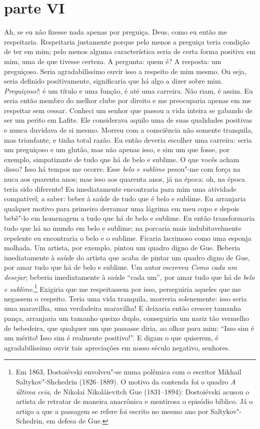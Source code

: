 \section{parte VI}

Ah, se eu não fizesse nada apenas por preguiça. Deus, como eu então me
respeitaria. Respeitaria justamente porque pelo menos a preguiça teria condição
de ter em mim; pelo menos alguma característica seria de certa forma positiva
em mim, uma de que tivesse certeza. A pergunta: quem é?  A resposta: um
preguiçoso. Seria agradabilíssimo ouvir isso a respeito de mim mesmo. Ou seja,
seria definido positivamente, significaria que há algo a dizer sobre mim.
\textit{Preguiçoso!}: é um título e uma função, é até uma carreira. Não riam, é assim.
Eu seria então membro do melhor clube por direito e me preocuparia apenas em me
respeitar sem cessar.  Conheci um senhor que passou a vida inteira se gabando
de ser um perito em Lafite. Ele considerava aquilo uma de suas qualidades
positivas e nunca duvidava de si mesmo. Morreu com a consciência não somente
tranquila, mas triunfante, e tinha total razão. Eu então deveria escolher uma
carreira: seria um preguiçoso e um glutão, mas não apenas isso, e sim um que
fosse, por exemplo, simpatizante de tudo que há de belo e sublime. O que vocês
acham disso? Isso há tempos me ocorre. Esse \textit{belo e sublime} pesou"-me com força
na nuca aos quarenta anos; mas isso aos quarenta anos, já na época: oh, na
época teria sido diferente! Eu imediatamente encontraria para mim uma atividade
compatível; a saber: beber à saúde de tudo que é belo e sublime. Eu arranjaria
qualquer motivo para primeiro derramar uma lágrima em meu copo e depois bebê"-lo
em homenagem a tudo que há de belo e sublime. Eu então transformaria tudo que
há no mundo em belo e sublime; na porcaria mais indubitavelmente repelente eu
encontraria o belo e o sublime. Ficaria lacrimoso como uma esponja molhada. Um
artista, por exemplo, pintou um quadro digno de Gue. Beberia imediatamente à
saúde do artista que acaba de pintar um quadro digno de Gue, por amar tudo que
há de belo e sublime. Um autor escreveu \textit{Como cada um desejar};
beberia imediatamente à saúde ``cada um'', por amar tudo que há de \textit{belo e
sublime}.\footnote{ Em 1863, Dostoiévski envolveu"-se numa polêmica com o
escritor Mikhail Saltykov"-Shchedrin (1826--1889). O motivo da contenda foi o
quadro \textit{A última ceia}, de Nikolai Nikoláievitch Gue (1831--1894):
Dostoiévski acusou o artista de retratar de maneira anacrônica e mentirosa o
episódio bíblico. Já o artigo a que a passagem se refere foi escrito no mesmo
ano por Saltykov"-Schedrin, em defesa de Gue.} Exigiria que me respeitassem por
isso, perseguiria aqueles que me negassem o respeito.  Teria uma vida
tranquila, morreria solenemente: isso seria uma maravilha, uma verdadeira
maravilha! E deixaria então crescer tamanha pança, arranjaria um tamanho queixo
duplo, conseguiria um nariz tão vermelho de bebedeira, que qualquer um que
passasse diria, ao olhar para mim: ``Isso sim é um mérito! Isso sim é realmente
positivo!''. E digam o que quiserem, é agradabilíssimo ouvir tais apreciações em
nosso século negativo, senhores.


